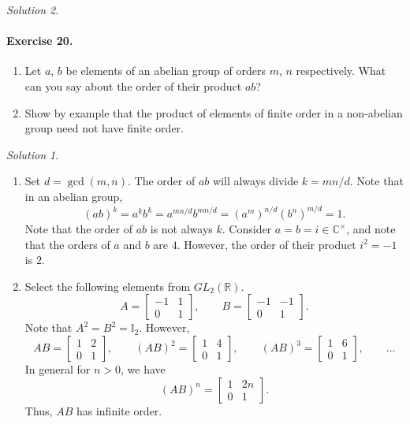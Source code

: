 \documentclass[11pt]{report}
\def\C{\mathbb{C}}
\def\R{\mathbb{R}}
\theoremstyle{remark}
\newtheorem*{solution}{Solution}
\begin{document}
\begin{solution}
    \paragraph{Exercise 20.} \mbox{}
    \begin{enumerate}
        \itemsep0em
        \item Let $a$, $b$ be elements of an abelian group of orders $m$, $n$
        respectively. What can you say about the order of their product $ab$?
        \item Show by example that the product of elements of finite order in a
        non-abelian group need not have finite order.
    \end{enumerate}
    \begin{solution} \mbox{}
    \begin{enumerate}
        \item Set $d = \gcd(m, n)$. The order of $ab$ will always divide $k = mn / d$.
        Note that in an abelian group, \[
            (ab)^k = a^kb^k = a^{mn / d}b^{mn / d} = (a^m)^{n / d} (b^n)^{m / d} =
            1.
        \] Note that the order of $ab$ is not always $k$. Consider $a = b = i \in
        \C^\times$, and note that the orders of $a$ and $b$ are $4$. However, the
        order of their product $i^2 = -1$ is $2$.

        \item Select the following elements from $GL_2(\R)$. \[
            A = \begin{bmatrix}
                -1 & 1 \\ 0 & 1
            \end{bmatrix}, \qquad
            B = \begin{bmatrix}
                -1 & -1 \\ 0 & 1
            \end{bmatrix}.
        \] Note that $A^2 = B^2 = \mathbb{I}_2$. However, \[
            AB = \begin{bmatrix}
                1 & 2 \\ 0 & 1
            \end{bmatrix}, \qquad
            (AB)^2 = \begin{bmatrix}
                1 & 4 \\ 0 & 1
            \end{bmatrix}, \qquad
            (AB)^3 = \begin{bmatrix}
                1 & 6 \\ 0 & 1
            \end{bmatrix}, \qquad
            \dots
        \] In general for $n > 0$, we have \[
            (AB)^n = \begin{bmatrix}
                1 & 2n \\ 0 & 1
            \end{bmatrix}.
        \] Thus, $AB$ has infinite order.
    \end{enumerate}
    \end{solution}


\end{solution}
\end{document}

